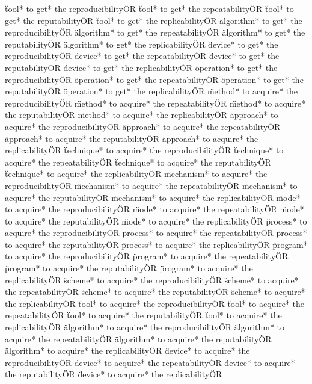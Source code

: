 \documentclass[
10pt, %
a4paper, %
oneside, %
headinclude,footinclude, %
BCOR5mm, %
]{scrartcl}
\begin{document}
\"tool* to get* the reproducibility\" OR \"tool* to get* the repeatability\" OR \"tool* to get* the reputability\" OR \"tool* to get* the replicability\" OR 
\"algorithm* to get* the reproducibility\" OR \"algorithm* to get* the repeatability\" OR \"algorithm* to get* the reputability\" OR \"algorithm* to get* the replicability\" OR 
\"device* to get* the reproducibility\" OR \"device* to get* the repeatability\" OR \"device* to get* the reputability\" OR \"device* to get* the replicability\" OR 
\"operation* to get* the reproducibility\" OR \"operation* to get* the repeatability\" OR \"operation* to get* the reputability\" OR \"operation* to get* the replicability\" OR 
\"method* to acquire* the reproducibility\" OR \"method* to acquire* the repeatability\" OR \"method* to acquire* the reputability\" OR \"method* to acquire* the replicability\" OR 
\"approach* to acquire* the reproducibility\" OR \"approach* to acquire* the repeatability\" OR \"approach* to acquire* the reputability\" OR \"approach* to acquire* the replicability\" OR 
\"technique* to acquire* the reproducibility\" OR \"technique* to acquire* the repeatability\" OR \"technique* to acquire* the reputability\" OR \"technique* to acquire* the replicability\" OR 
\"mechanism* to acquire* the reproducibility\" OR \"mechanism* to acquire* the repeatability\" OR \"mechanism* to acquire* the reputability\" OR \"mechanism* to acquire* the replicability\" OR 
\"mode* to acquire* the reproducibility\" OR \"mode* to acquire* the repeatability\" OR \"mode* to acquire* the reputability\" OR \"mode* to acquire* the replicability\" OR 
\"process* to acquire* the reproducibility\" OR \"process* to acquire* the repeatability\" OR \"process* to acquire* the reputability\" OR \"process* to acquire* the replicability\" OR 
\"program* to acquire* the reproducibility\" OR \"program* to acquire* the repeatability\" OR \"program* to acquire* the reputability\" OR \"program* to acquire* the replicability\" OR 
\"scheme* to acquire* the reproducibility\" OR \"scheme* to acquire* the repeatability\" OR \"scheme* to acquire* the reputability\" OR \"scheme* to acquire* the replicability\" OR 
\"tool* to acquire* the reproducibility\" OR \"tool* to acquire* the repeatability\" OR \"tool* to acquire* the reputability\" OR \"tool* to acquire* the replicability\" OR 
\"algorithm* to acquire* the reproducibility\" OR \"algorithm* to acquire* the repeatability\" OR \"algorithm* to acquire* the reputability\" OR \"algorithm* to acquire* the replicability\" OR 
\"device* to acquire* the reproducibility\" OR \"device* to acquire* the repeatability\" OR \"device* to acquire* the reputability\" OR \"device* to acquire* the replicability\" OR 
\end{document}
